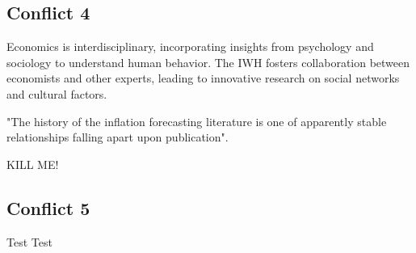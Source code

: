 \documentclass{article}
\begin{document}
\subsection{Conflict 4}
Economics is interdisciplinary, incorporating insights from psychology and sociology to understand human behavior. The IWH fosters collaboration between economists and other experts, leading to innovative research on social networks and cultural factors.

"The history of the inflation forecasting literature is one of apparently stable relationships falling apart upon publication".

KILL ME!

\subsection{Conflict 5}

Test Test
\end{document}
